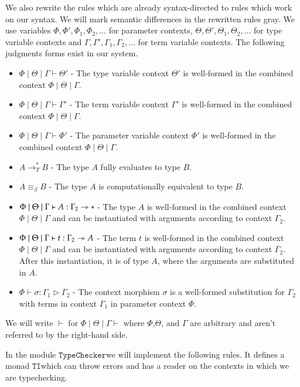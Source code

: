 \documentclass[a4paper,cleardoubleempty,BCOR1cm]{scrbook}
\begin{document}
We also rewrite the rules which are already syntax-directed to rules which
work on our syntax.   We will mark semantic differences in the rewritten rules
gray. We use variables \(\Phi,\Phi',\Phi_1,\Phi_2,\dots\) for parameter contexts,
\(\Theta,\Theta',\Theta_1,\Theta_2,\dots\) for type variable contexts and
\(\Gamma,\Gamma',\Gamma_1,\Gamma_2,\dots\) for term variable contexts.
The following judgments forms exist in our system.
\begin{itemize}
\item \(\Phi\mid\Theta\mid\Gamma\vdash\Theta'\) - The type variable context
\(\Theta'\) is well-formed in the combined context \(\Phi\mid\Theta\mid\Gamma\).
\item \(\Phi\mid\Theta\mid\Gamma\vdash\Gamma'\) - The term variable context
\(\Gamma'\) is well-formed in the combined context \(\Phi\mid\Theta\mid\Gamma\).
\item \(\Phi\mid\Theta\mid\Gamma\vdash\Phi'\) - The parameter variable context
\(\Phi'\) is well-formed in the combined context \(\Phi\mid\Theta\mid\Gamma\).
\item \(A\longrightarrow_T^* B\) - The type \(A\) fully evaluates to type \(B\).
\item \(A \equiv_\beta B\) - The type \(A\) is computationally equivalent to type \(B\).
\item \(\Phi\mid\Theta\mid\Gamma\vdash A : \Gamma_2\rightarrowtriangle*\) - The type
\(A\) is well-formed in the combined context \(\Phi\mid\Theta\mid\Gamma\) and
can be instantiated with arguments according to context \(\Gamma_2\).
\item \(\Phi\mid\Theta\mid\Gamma\vdash t : \Gamma_2\rightarrowtriangle A\) - The term \(t\) is
well-formed in the combined context \(\Phi\mid\Theta\mid\Gamma\) and can be
instantiated with arguments according to context \(\Gamma_2\).  After this
instantiation, it is of type \(A\), where the arguments are substituted in \(A\).
\item \(\Phi \vdash \sigma : \Gamma_1 \triangleright \Gamma_2\) - The context
morphism \(\sigma\) is a well-formed substitution for \(\Gamma_2\) with terms
in context \(\Gamma_1\) in parameter context \(\Phi\).
\end{itemize}
We will write \(\vdash\) for \(\Phi\mid\Theta\mid\Gamma\vdash\) where
\(\Phi\),\(\Theta\), and \(\Gamma\) are arbitrary and aren't referred to by the
right-hand side.

In the module $\mathtt{TypeChecker}$\;we will implement the following rules.  It
defines a monad $\mathtt{TI}$\;which can throw errors and has a reader on the contexts
in which we are typechecking.
\end{document}
